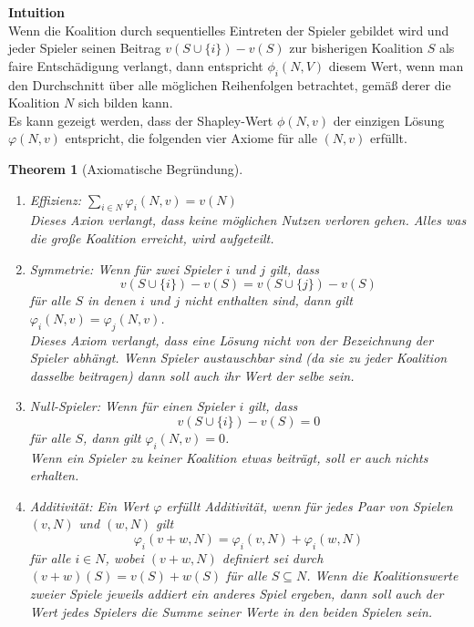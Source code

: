 \documentclass[12pt]{extreport} %
\theoremstyle{named}
\newtheorem{unnamedtheorem}{Theorem} \counterwithin{unnamedtheorem}{chapter}
\theoremstyle{itshape}
\theoremstyle{normal}
\begin{document}
\textbf{Intuition} ~\\
Wenn die Koalition durch sequentielles Eintreten der Spieler gebildet wird und jeder Spieler seinen Beitrag $v(S \cup \{ i \}) - v(S)$ zur bisherigen Koalition $S$ als faire Entschädigung verlangt, dann entspricht $\phi_i(N, V)$ diesem Wert, wenn man den Durchschnitt über alle möglichen Reihenfolgen betrachtet, gemä{\ss} derer die Koalition $N$ sich bilden kann. ~\\

Es kann gezeigt werden, dass der Shapley-Wert $\phi(N, v)$ der einzigen Lösung $\varphi(N, v)$ entspricht, die folgenden vier Axiome für alle $(N, v)$ erfüllt.

\begin{unnamedtheorem}[Axiomatische Begründung] ~\
	\begin{enumerate}
		\item[A1] Effizienz: $\sum_{i \in N} \varphi_i(N,v) = v(N)$ ~\\
			\textit{Dieses Axion verlangt, dass keine möglichen Nutzen verloren gehen. Alles was die große Koalition erreicht, wird aufgeteilt.}
		\item[A2] Symmetrie: Wenn für zwei Spieler $i$ und $j$ gilt, dass
			$$ v\left( S \cup \{i\} \right) - v(S) = v\left( S \cup \{j\} \right) - v(S) $$
			für alle $S$ in denen $i$ und $j$ nicht enthalten sind, dann gilt $\varphi_i(N,v) = \varphi_j(N,v)$. ~\\
			\textit{Dieses Axiom verlangt, dass eine Lösung nicht von der Bezeichnung der Spieler abhängt. Wenn Spieler austauschbar sind (da sie zu jeder Koalition dasselbe beitragen) dann soll auch ihr Wert der selbe sein.}
		\item[A3] Null-Spieler: Wenn für einen Spieler $i$ gilt, dass
			$$ v\left( S \cup \{i\} \right) - v(S) = 0 $$
			für alle $S$, dann gilt $\varphi_i(N, v) = 0$. ~\\
			\textit{Wenn ein Spieler zu keiner Koalition etwas beiträgt, soll er auch nichts erhalten.}	
		\item[A4] Additivität: Ein Wert $\varphi$ erfüllt Additivität, wenn für jedes Paar von Spielen $(v, N)$ und $(w, N)$ gilt
			$$ \varphi_i(v + w, N) = \varphi_i(v, N) + \varphi_i(w, N) $$
			für alle $i \in N$, wobei $(v + w, N)$ definiert sei durch $(v + w)(S) = v(S) + w(S)$ für alle $S \subseteq N$.
			\textit{Wenn die Koalitionswerte zweier Spiele jeweils addiert ein anderes Spiel ergeben, dann soll auch der Wert jedes Spielers die Summe seiner Werte in den beiden Spielen sein.}
	\end{enumerate}
\end{unnamedtheorem}
\end{document}
